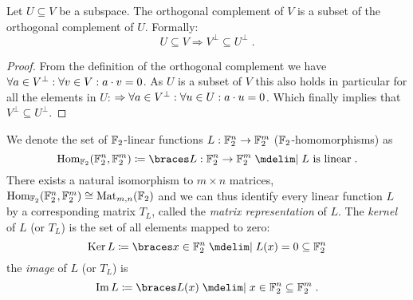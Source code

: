 \begin{lemma}\label{st:lem:subset_complements}
    Let $U \subseteq V$ be a subspace.
    The orthogonal complement of $V$ is a subset of the orthogonal complement of $U$.
    Formally:
    \begin{equation*}
        U \subseteq V \Rightarrow V^\perp \subseteq U^\perp\;.
    \end{equation*}
\end{lemma}
\begin{proof}
    From the definition of the orthogonal complement we have $\forall a \in V^\perp : \forall v \in V : a \cdot v = 0$.
    As $U$ is a subset of $V$ this also holds in particular for all the elements in $U$: $\Rightarrow \forall a \in V^\perp : \forall u \in U : a \cdot u = 0$.
    Which finally implies that $V^\perp \subseteq U^\perp$.
\end{proof}

We denote the set of $\mathbb{F}_2$-linear functions $L : \mathbb{F}_2^n \to \mathbb{F}_2^m$ ($\mathbb{F}_2$-homomorphisms) as
\begin{equation*}
    \mathrm{Hom}_{\F_2}(\F_2^n, \F_2^m) \coloneqq \set{L : \F_2^n \to \F_2^m \given L\ \text{is linear}}\;.
\end{equation*}
There exists a natural isomorphism to $m \times n$ matrices, $\mathrm{Hom}_{\mathbb{F}_2}(\mathbb{F}_2^n, \mathbb{F}_2^m) \cong \mathrm{Mat}_{m,n}(\mathbb{F}_2)$ and we can thus identify every linear function $L$ by a corresponding matrix $T_L$, called the \emph{matrix representation} of $L$.
The \emph{kernel} of $L$ (or $T_L$) is the set of all elements mapped to zero:
\begin{equation*}
    \Ker{L} \coloneqq \set{x \in \F_2^n \given L(x) = 0} \subseteq \F_2^n
\end{equation*}
the \emph{image} of $L$ (or $T_L$) is
\begin{equation*}
    \Im{L} \coloneqq \set{L(x) \given x \in \F_2^n} \subseteq \F_2^m\;.
\end{equation*}

